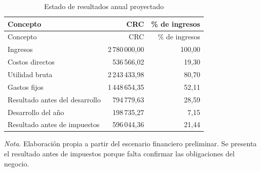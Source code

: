 \begin{longtable}{lrr}
\caption{Estado de resultados anual proyectado}\\
\toprule
Concepto & CRC & \% de ingresos \\
\midrule
\endfirsthead
\toprule
Concepto & CRC & \% de ingresos \\
\midrule
\endhead
Ingresos & 2\,780\,000,00 & 100,00 \\
Costos directos & 536\,566,02 & 19,30 \\
Utilidad bruta & 2\,243\,433,98 & 80,70 \\
Gastos fijos & 1\,448\,654,35 & 52,11 \\
Resultado antes del desarrollo & 794\,779,63 & 28,59 \\
Desarrollo del año & 198\,735,27 & 7,15 \\
Resultado antes de impuestos & 596\,044,36 & 21,44 \\
\bottomrule
\end{longtable}
{\small\textit{Nota}. Elaboración propia a partir del escenario financiero preliminar. Se presenta el resultado antes de impuestos porque falta confirmar las obligaciones del negocio.}
